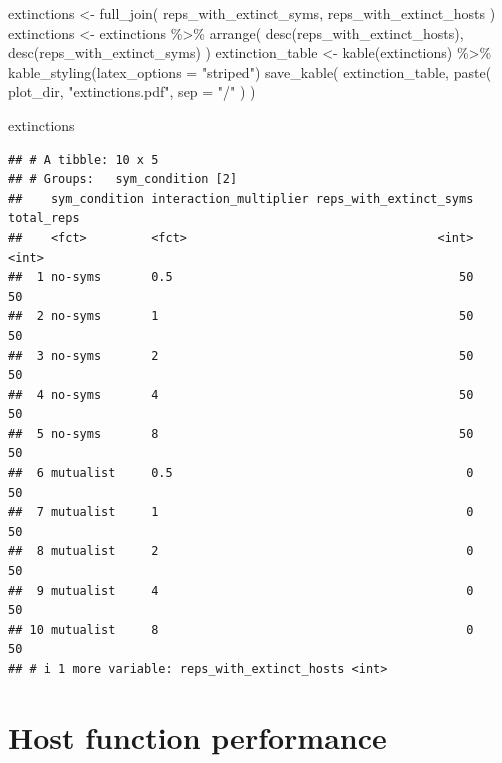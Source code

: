\documentclass[
]{book}
\newenvironment{Shaded}{\begin{snugshade}}{\end{snugshade}}
\newcommand{\AttributeTok}[1]{\textcolor[rgb]{0.77,0.63,0.00}{#1}}
\newcommand{\FunctionTok}[1]{\textcolor[rgb]{0.00,0.00,0.00}{#1}}
\newcommand{\NormalTok}[1]{#1}
\newcommand{\OtherTok}[1]{\textcolor[rgb]{0.56,0.35,0.01}{#1}}
\newcommand{\SpecialCharTok}[1]{\textcolor[rgb]{0.00,0.00,0.00}{#1}}
\newcommand{\StringTok}[1]{\textcolor[rgb]{0.31,0.60,0.02}{#1}}
\begin{document}
\begin{Shaded}
\begin{Highlighting}[]
\NormalTok{extinctions }\OtherTok{\textless{}{-}} \FunctionTok{full\_join}\NormalTok{(}
\NormalTok{  reps\_with\_extinct\_syms,}
\NormalTok{  reps\_with\_extinct\_hosts}
\NormalTok{)}
\NormalTok{extinctions }\OtherTok{\textless{}{-}}\NormalTok{ extinctions }\SpecialCharTok{\%\textgreater{}\%}
  \FunctionTok{arrange}\NormalTok{(}
    \FunctionTok{desc}\NormalTok{(reps\_with\_extinct\_hosts), }\FunctionTok{desc}\NormalTok{(reps\_with\_extinct\_syms)}
\NormalTok{  )}
\NormalTok{extinction\_table }\OtherTok{\textless{}{-}} \FunctionTok{kable}\NormalTok{(extinctions) }\SpecialCharTok{\%\textgreater{}\%}
  \FunctionTok{kable\_styling}\NormalTok{(}\AttributeTok{latex\_options =} \StringTok{"striped"}\NormalTok{)}
\FunctionTok{save\_kable}\NormalTok{(}
\NormalTok{  extinction\_table,}
  \FunctionTok{paste}\NormalTok{(}
\NormalTok{    plot\_dir,}
    \StringTok{"extinctions.pdf"}\NormalTok{,}
    \AttributeTok{sep =} \StringTok{"/"}
\NormalTok{  )}
\NormalTok{)}

\NormalTok{extinctions}
\end{Highlighting}
\end{Shaded}

\begin{verbatim}
## # A tibble: 10 x 5
## # Groups:   sym_condition [2]
##    sym_condition interaction_multiplier reps_with_extinct_syms total_reps
##    <fct>         <fct>                                   <int>      <int>
##  1 no-syms       0.5                                        50         50
##  2 no-syms       1                                          50         50
##  3 no-syms       2                                          50         50
##  4 no-syms       4                                          50         50
##  5 no-syms       8                                          50         50
##  6 mutualist     0.5                                         0         50
##  7 mutualist     1                                           0         50
##  8 mutualist     2                                           0         50
##  9 mutualist     4                                           0         50
## 10 mutualist     8                                           0         50
## # i 1 more variable: reps_with_extinct_hosts <int>
\end{verbatim}

\hypertarget{host-function-performance-4}{%
\section{Host function performance}\label{host-function-performance-4}}
\end{document}
